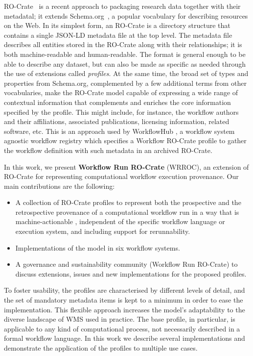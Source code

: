 \documentclass[10pt,letterpaper]{article}
\begin{document}
RO-Crate~\cite{Soiland-Reyes 2022a} is a recent approach to packaging research data together with their metadatal; it extends Schema.org~\cite{Guha 2015}, a popular vocabulary for describing resources on the Web.
In its simplest form, an RO-Crate is a directory structure that contains a single JSON-LD metadata file at the top level.
The metadata file describes all entities stored in the RO-Crate along with their relationships; it is both machine-readable and human-readable.
The format is general enough to be able to describe any dataset, but can also be made as specific as needed through the use of extensions called
\emph{profiles}.
At the same time, the broad set of types and properties from Schema.org, complemented by a few additional terms from other vocabularies, make the RO-Crate model capable of expressing a wide range of contextual information that complements and enriches the core information specified by the profile.
This might include, for instance, the workflow authors and their affiliations, associated publications, licensing information, related software, etc.
This is an approach used by WorkflowHub \cite{Goble 2021}, a workflow system agnostic workflow registry which specifies a Workflow RO-Crate profile \cite{Bacall 2022} to gather the workflow definition with such metadata in an archived RO-Crate. 

In this work, we present \textbf{Workflow Run RO-Crate} (WRROC), an extension of RO-Crate for representing computational workflow execution provenance.
Our main contributions are the following:

\begin{itemize}
\item   A collection of RO-Crate profiles to represent both the prospective and the retrospective provenance of a computational   workflow run in a way that is machine-actionable \cite{Batista 2022},  independent of the specific  workflow language or   execution system, and including support for rerunnability.
\item   Implementations of the model in six workflow systems.
\item   A governance and sustainability community (Workflow Run RO-Crate) to discuss extensions,  issues and new implementations for the proposed   profiles.
\end{itemize}

To foster usability, the profiles are characterised by different levels of detail, and the set of mandatory metadata items is kept to a minimum in order to ease the implementation.
This flexible approach increases the model's adaptability to the diverse landscape of WMS used in practice.
The base profile, in particular, is applicable to any kind of computational process, not necessarily described in a formal workflow language.
In this work we describe several implementations and demonstrate the application of the profiles to multiple use cases.
\end{document}
